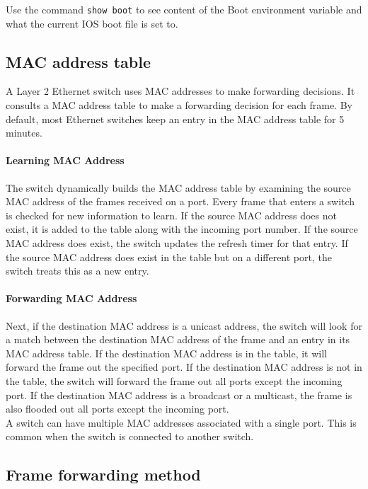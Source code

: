 Use the command \verb|show boot| to see content of the Boot environment variable and what the current IOS boot file is set to.

\subsection{MAC address table}

A Layer 2 Ethernet switch uses MAC addresses to make forwarding decisions. It consults a MAC address table to make a forwarding decision for each frame. By default, most Ethernet switches keep an entry in the MAC address table for 5 minutes.

\paragraph{Learning MAC Address} The switch dynamically builds the MAC address table by examining the source MAC address of the frames received on a port. Every frame that enters a switch is checked for new information to learn. If the source MAC address does not exist, it is added to the table along with the incoming port number. If the source MAC address does exist, the switch updates the refresh timer for that entry.  If the source MAC address does exist in the table but on a different port, the switch treats this as a new entry.

\paragraph{Forwarding MAC Address} Next, if the destination MAC address is a unicast address, the switch will look for a match between the destination MAC address of the frame and an entry in its MAC address table. If the destination MAC address is in the table, it will forward the frame out the specified port. If the destination MAC address is not in the table, the switch will forward the frame out all ports except the incoming port. If the destination MAC address is a broadcast or a multicast, the frame is also flooded out all ports except the incoming port.\\

A switch can have multiple MAC addresses associated with a single port. This is common when the switch is connected to another switch.

\subsection{Frame forwarding method}

